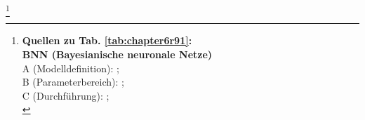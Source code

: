 \begin{otherlanguage}{ngerman}





\footnote{%
\begin{minipage}[t]{\textwidth}
\scriptsize
\textbf{Quellen zu Tab. \ref{tab:chapter6r91}:}\\[0.5em]
\textbf{BNN (Bayesianische neuronale Netze)}\\
A (Modelldefinition): \parencite[Kap.~3]{blundell2015weight}; \parencite[S.~40–42]{gal2016uncertainty} \\
B (Parameterbereich): \parencite[S.~448–450]{mackay1992practical}; \parencite[Kap.~5]{rasmussen2006gaussian} \\
C (Durchführung): \parencite[S.~41–42]{gal2016uncertainty}; \parencite{blundell2015weight} \\[0.5em]


\end{minipage}}
\end{otherlanguage}
